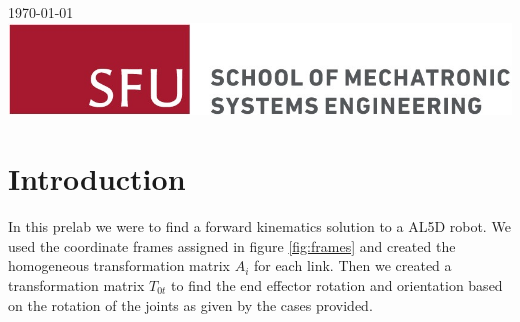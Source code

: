 \documentclass[12pt]{article}
\begin{document}
\begin{titlepage}
{\large \today}\\[2cm] %


\includegraphics[scale=2.0]{MSE-Logo.jpg}\\[1cm] %

\vfill %

\end{titlepage}

\tableofcontents	%

\listoffigures
{}	%

 \listoftables

\lstlistoflistings
{}

\pagebreak
\setcounter{page}{1}	%
\setlength{\parskip}{1em}

\section{Introduction}
In this prelab we were to find a forward kinematics solution to a AL5D robot. We used the coordinate frames assigned in figure \ref{fig:frames} and created the homogeneous transformation matrix $A_{i}$ for each link. Then we created a transformation matrix $T_{0t}$ to find the end effector rotation and orientation based on the rotation of the joints as given by the cases provided.
\end{document}
